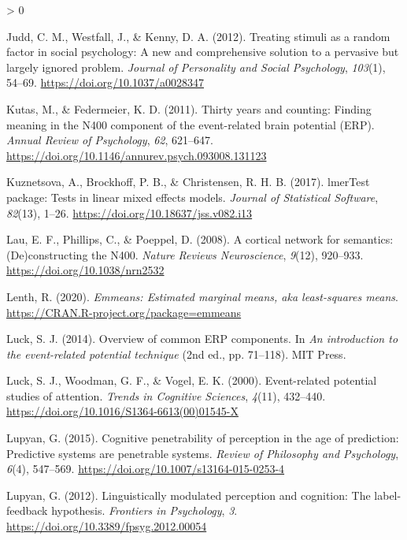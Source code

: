 \documentclass[
  english,
  man,floatsintext]{apa7}
\newlength{\cslhangindent}
\newenvironment{CSLReferences}[2] %
 {%
  \setlength{\parindent}{0pt}
  \ifodd #1 \everypar{\setlength{\hangindent}{\cslhangindent}}\ignorespaces\fi
  \ifnum #2 > 0
  \setlength{\parskip}{#2\baselineskip}
  \fi
 }%
 {}
\begin{document}
\begin{CSLReferences}{1}{0}
\leavevmode\hypertarget{ref-judd2012}{}%
Judd, C. M., Westfall, J., \& Kenny, D. A. (2012). Treating stimuli as a random factor in social psychology: A new and comprehensive solution to a pervasive but largely ignored problem. \emph{Journal of Personality and Social Psychology}, \emph{103}(1), 54--69. \url{https://doi.org/10.1037/a0028347}

\leavevmode\hypertarget{ref-kutas2011}{}%
Kutas, M., \& Federmeier, K. D. (2011). Thirty years and counting: Finding meaning in the {N400} component of the event-related brain potential ({ERP}). \emph{Annual Review of Psychology}, \emph{62}, 621--647. \url{https://doi.org/10.1146/annurev.psych.093008.131123}

\leavevmode\hypertarget{ref-R-lmerTest}{}%
Kuznetsova, A., Brockhoff, P. B., \& Christensen, R. H. B. (2017). {lmerTest} package: Tests in linear mixed effects models. \emph{Journal of Statistical Software}, \emph{82}(13), 1--26. \url{https://doi.org/10.18637/jss.v082.i13}

\leavevmode\hypertarget{ref-lau2008}{}%
Lau, E. F., Phillips, C., \& Poeppel, D. (2008). A cortical network for semantics: (De)constructing the {N400}. \emph{Nature Reviews Neuroscience}, \emph{9}(12), 920--933. \url{https://doi.org/10.1038/nrn2532}

\leavevmode\hypertarget{ref-R-emmeans}{}%
Lenth, R. (2020). \emph{Emmeans: Estimated marginal means, aka least-squares means}. \url{https://CRAN.R-project.org/package=emmeans}

\leavevmode\hypertarget{ref-luck2014}{}%
Luck, S. J. (2014). Overview of common ERP components. In \emph{An introduction to the event-related potential technique} (2nd ed., pp. 71--118). MIT Press.

\leavevmode\hypertarget{ref-luck2000}{}%
Luck, S. J., Woodman, G. F., \& Vogel, E. K. (2000). Event-related potential studies of attention. \emph{Trends in Cognitive Sciences}, \emph{4}(11), 432--440. \url{https://doi.org/10.1016/S1364-6613(00)01545-X}

\leavevmode\hypertarget{ref-lupyan2015}{}%
Lupyan, G. (2015). Cognitive penetrability of perception in the age of prediction: Predictive systems are penetrable systems. \emph{Review of Philosophy and Psychology}, \emph{6}(4), 547--569. \url{https://doi.org/10.1007/s13164-015-0253-4}

\leavevmode\hypertarget{ref-lupyan2012}{}%
Lupyan, G. (2012). Linguistically modulated perception and cognition: The label-feedback hypothesis. \emph{Frontiers in Psychology}, \emph{3}. \url{https://doi.org/10.3389/fpsyg.2012.00054}


\end{CSLReferences}
\end{document}
